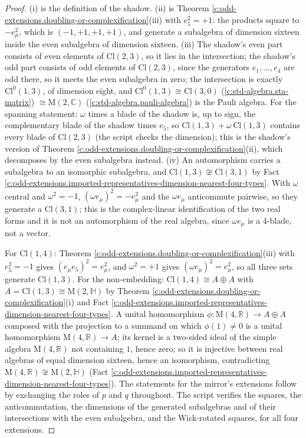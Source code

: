\documentclass[11pt]{article}
\theoremstyle{definition}
\theoremstyle{plain}
\providecommand{\C}{}\renewcommand{\C}{\mathbb{C}}
\providecommand{\Cl}{}\renewcommand{\Cl}{\mathrm{Cl}}
\providecommand{\HH}{}\renewcommand{\HH}{\mathbb{H}}
\providecommand{\Mat}{}\renewcommand{\Mat}{\mathrm{M}}
\providecommand{\R}{}\renewcommand{\R}{\mathbb{R}}
\begin{document}
\begin{proof}
(i) is the definition of the shadow. (ii) is Theorem \ref{c:odd-extensions.doubling-or-complexification}(iii) with $e_{5}^{2} = +1$: the products square to $-e_{\mu}^{2}$, which is $(-1, +1, +1, +1)$, and generate a subalgebra of dimension sixteen inside the even subalgebra of dimension sixteen. (iii) The shadow's even part consists of even elements of $\Cl(2,3)$, so it lies in the intersection; the shadow's odd part consists of odd elements of $\Cl(2,3)$, since the generators $e_{1}, \ldots, e_{4}$ are odd there, so it meets the even subalgebra in zero; the intersection is exactly $\Cl^{0}(1,3)$, of dimension eight, and $\Cl^{0}(1,3) \cong \Cl(3,0)$ (\ref{c:std-algebra.sta-matrix}) $\cong \Mat(2,\C)$ (\ref{c:std-algebra.pauli-algebra}) is the Pauli algebra. For the spanning statement: $\omega$ times a blade of the shadow is, up to sign, the complementary blade of the shadow times $e_{5}$, so $\Cl(1,3) + \omega\,\Cl(1,3)$ contains every blade of $\Cl(2,3)$ (the script checks the dimension); this is the shadow's version of Theorem \ref{c:odd-extensions.doubling-or-complexification}(ii), which decomposes by the even subalgebra instead. (iv) An automorphism carries a subalgebra to an isomorphic subalgebra, and $\Cl(1,3) \not\cong \Cl(3,1)$ by Fact \ref{c:odd-extensions.imported-representatives-dimension-nearest-four-types}. With $\omega$ central and $\omega^{2} = -1$, $(\omega e_{\mu})^{2} = -e_{\mu}^{2}$ and the $\omega e_{\mu}$ anticommute pairwise, so they generate a $\Cl(3,1)$; this is the complex-linear identification of the two real forms and it is not an automorphism of the real algebra, since $\omega e_{\mu}$ is a $4$-blade, not a vector.

For $\Cl(1,4)$: Theorem \ref{c:odd-extensions.doubling-or-complexification}(iii) with $e_{5}^{2} = -1$ gives $(e_{\mu}e_{5})^{2} = e_{\mu}^{2}$, and $\omega^{2} = +1$ gives $(\omega e_{\mu})^{2} = e_{\mu}^{2}$, so all three sets generate $\Cl(1,3)$. For the non-embedding: $\Cl(1,4) \cong A \oplus A$ with $A = \Cl(1,3) \cong \Mat(2,\HH)$ by Theorem \ref{c:odd-extensions.doubling-or-complexification}(i) and Fact \ref{c:odd-extensions.imported-representatives-dimension-nearest-four-types}. A unital homomorphism $\phi: \Mat(4,\R) \to A \oplus A$ composed with the projection to a summand on which $\phi(1) \neq 0$ is a unital homomorphism $\Mat(4,\R) \to A$; its kernel is a two-sided ideal of the simple algebra $\Mat(4,\R)$ not containing $1$, hence zero; so it is injective between real algebras of equal dimension sixteen, hence an isomorphism, contradicting $\Mat(4,\R) \not\cong \Mat(2,\HH)$ (Fact \ref{c:odd-extensions.imported-representatives-dimension-nearest-four-types}). The statements for the mirror's extensions follow by exchanging the roles of $p$ and $q$ throughout. The script verifies the squares, the anticommutation, the dimensions of the generated subalgebras and of their intersections with the even subalgebra, and the Wick-rotated squares, for all four extensions.

\end{proof}
\end{document}
